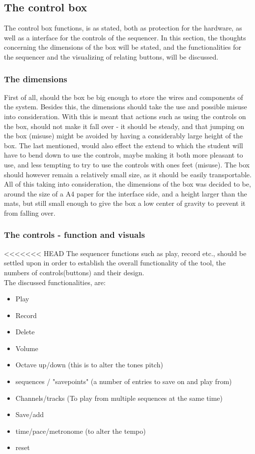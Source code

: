 \subsection{The control box}
The control box functions, is as stated, both as protection for the hardware, as well as a interface for the controls of the sequencer. In this section, the thoughts concerning the dimensions of the box will be stated, and the functionalities for the sequencer and the visualizing of relating buttons, will be discussed.

\subsubsection{The dimensions} 
First of all, should the box be big enough to store the wires and components of the system. Besides this, the dimensions should take the use and possible misuse into consideration. With this is meant that actions such as using the controls on the box, should not make it fall over - it should be steady, and that jumping on the box (misuse) might be avoided by having a considerably large height of the box. The last mentioned, would also effect the extend to which the student will have to bend down to use the controls, maybe making it both more pleasant to use, and less tempting to try to use the controls with ones feet (misuse). The box should however remain a relatively small size, as it should be easily transportable. \\ 
All of this taking into consideration, the dimensions of the box was decided to be, around the size of a A4 paper for the interface side, and a height larger than the mats, but still small enough to give the box a low center of gravity to prevent it from falling over.

\subsubsection{The controls - function and visuals} 
<<<<<<< HEAD
The sequencer functions such as play, record etc., should be settled upon in order to establish the overall functionality of the tool, the numbers of controls(buttons) and their design. \\  The discussed functionalities, are:  

\begin{itemize}
	\item Play 
	\item Record 
	\item Delete
	\item Volume
	\item Octave up/down (this is to alter the tones pitch)
	\item sequences / "savepoints" (a number of entries to save on and play from)
	\item Channels/tracks (To play from multiple sequences at the same time)
	\item Save/add
	\item time/pace/metronome (to alter the tempo)
	\item reset
\end{itemize}   

